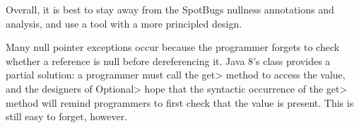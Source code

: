 Overall, it is best to stay away from the SpotBugs nullness annotations and
analysis, and use a tool with a more principled design.


%
%
%
%
%
%
%



Many null pointer exceptions occur because the programmer forgets to check
whether a reference is null before dereferencing it.  Java 8's
class provides a partial solution:  a programmer must call the \<get> method to
access the value, and the designers of \<Optional> hope that the syntactic
occurrence of the \<get> method will remind programmers to first check that
the value is present.  This is still easy to forget, however.

